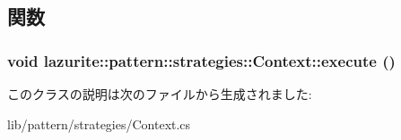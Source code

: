 \subsection{関数}
\hypertarget{classlazurite_1_1pattern_1_1strategies_1_1_context_ac4258d4e4aa5d69ae0db8e8fee45f8f8}{
\subsubsection[{execute}]{\setlength{\rightskip}{0pt plus 5cm}void lazurite::pattern::strategies::Context::execute ()}}
\label{classlazurite_1_1pattern_1_1strategies_1_1_context_ac4258d4e4aa5d69ae0db8e8fee45f8f8}


このクラスの説明は次のファイルから生成されました:\begin{DoxyCompactItemize}
\item 
lib/pattern/strategies/Context.cs\end{DoxyCompactItemize}

